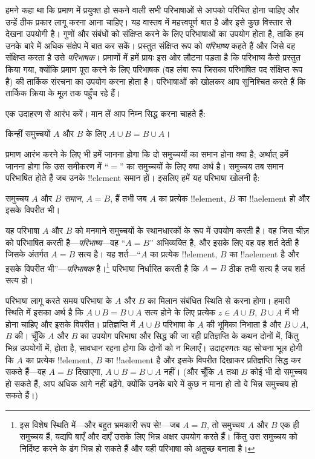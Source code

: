 \documentclass[../../../include/open-logic-section]{subfiles}
\begin{document}


हमने कहा था कि प्रमाण में प्रयुक्त हो सकने वाली सभी परिभाषाओं से आपको
परिचित होना चाहिए और उन्हें ठीक प्रकार लागू करना आना चाहिए। यह वास्तव में
महत्त्वपूर्ण बात है और इसे कुछ विस्तार से देखना उपयोगी है। गुणों और संबंधों
को संक्षिप्त करने के लिए परिभाषाओं का उपयोग होता है, ताकि हम उनके बारे में
अधिक संक्षेप में बात कर सकें। प्रस्तुत संक्षिप्त रूप को \emph{परिभाष्य}
कहते हैं और जिसे वह संक्षिप्त करता है उसे \emph{परिभाषक}। प्रमाणों में हमें
प्रायः इस ओर लौटना पड़ता है कि परिभाष्य कैसे प्रस्तुत किया गया, क्योंकि
प्रमाण पूरा करने के लिए परिभाषक (वह लंबा रूप जिसका परिभाषित पद संक्षिप्त रूप
है) की तार्किक संरचना का उपयोग करना होता है। परिभाषाओं को खोलकर आप सुनिश्चित
करते हैं कि तार्किक क्रिया के मूल तक पहुँच रहे हैं।

एक उदाहरण से आरंभ करें। मान लें आप निम्न सिद्ध करना चाहते हैं:

\begin{prop}
किन्हीं समुच्चयों $A$ और $B$ के लिए $A\cup B=B\cup A$।
\end{prop}

प्रमाण आरंभ करने के लिए भी हमें जानना होगा कि दो समुच्चयों का समान होना क्या
है; अर्थात् हमें जानना होगा कि उस समीकरण में ``$=$'' का समुच्चयों के लिए
क्या अर्थ है। समुच्चय तब समान परिभाषित होते हैं जब उनके !!{element} समान
हों। इसलिए हमें यह परिभाषा खोलनी है:

\begin{defn}
समुच्चय $A$ और $B$ \emph{समान}, $A=B$, हैं तभी जब $A$ का प्रत्येक
!!{element}, $B$ का !!a{element} हो और इसके विपरीत भी।
\end{defn}

यह परिभाषा $A$ और $B$ को मनमाने समुच्चयों के स्थानधारकों के रूप में उपयोग
करती है। वह जिस चीज़ को परिभाषित करती है---\emph{परिभाष्य}---वह ``$A=B$''
अभिव्यक्ति है, और इसके लिए वह वह शर्त देती है जिसके अंतर्गत $A=B$ सत्य है।
यह शर्त---``$A$ का प्रत्येक !!{element}, $B$ का !!a{element} है और इसके
विपरीत भी''---\emph{परिभाषक} है।\footnote{इस विशेष स्थिति में---और बहुत
भ्रमकारी रूप से!---जब $A=B$, तो समुच्चय $A$ और $B$ एक ही समुच्चय हैं, यद्यपि
बाएँ और दाएँ उसके लिए भिन्न अक्षर उपयोग करते हैं। किंतु उस समुच्चय को निर्दिष्ट
करने के ढंग भिन्न हो सकते हैं और यही परिभाषा को अतुच्छ बनाता है।} परिभाषा
निर्धारित करती है कि $A=B$ ठीक तभी सत्य है जब शर्त सत्य हो।

परिभाषा लागू करते समय परिभाषा के $A$ और $B$ का मिलान संबंधित स्थिति से
करना होगा। हमारी स्थिति में इसका अर्थ है कि $A\cup B=B\cup A$ सत्य होने के
लिए प्रत्येक $z\in A\cup B$, $B\cup A$ में भी होना चाहिए और इसके विपरीत।
प्रतिज्ञप्ति में $A\cup B$ परिभाषा के $A$ की भूमिका निभाता है और $B\cup A$,
$B$ की। चूँकि $A$ और $B$ का उपयोग परिभाषा और सिद्ध की जा रही प्रतिज्ञप्ति
के कथन दोनों में, किंतु भिन्न उपयोगों में, होता है, सावधान रहना होगा कि दोनों
को न मिलाएँ। उदाहरणतः यह सोचना भूल होगी कि $A$ का प्रत्येक !!{element},
$B$ का !!a{element} है और इसके विपरीत दिखाकर प्रतिज्ञप्ति सिद्ध कर सकते
हैं---वह $A=B$ दिखाएगा, $A\cup B=B\cup A$ नहीं। (और चूँकि $A$ तथा $B$
कोई भी दो समुच्चय हो सकते हैं, आप अधिक आगे नहीं बढ़ेंगे, क्योंकि उनके बारे
में कुछ न माना हो तो वे भिन्न समुच्चय हो सकते हैं।)
\end{document}
